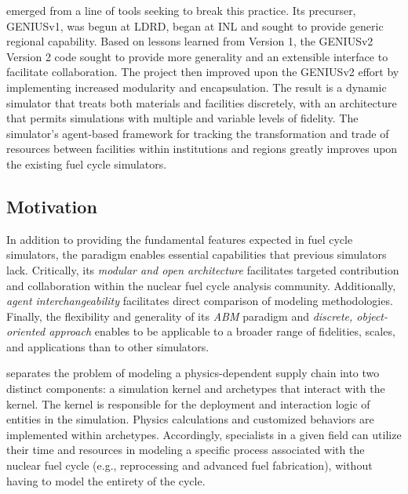 \Cyclus emerged from a line of tools seeking to break this practice.  
Its precurser, \gls{GENIUSv1}\cite{dunzik-gougar_global_2007,jain_transitioning_2006}, was begun at \gls{LDRD}, began at \gls{INL} and sought 
to provide generic regional capability.  Based on lessons learned from 
Version 1, the 
\acrshort{GENIUSv2} Version 2\cite{oliver_studying_2009,huff_geniusv2_2009} code sought to 
provide more generality and an extensible interface to facilitate 
collaboration.  The \Cyclus project then improved upon the \acrshort{GENIUSv2} 
effort by implementing increased modularity and encapsulation.  The result is  
a dynamic simulator that treats both materials and facilities discretely, with 
an architecture that permits simulations with multiple and variable levels of 
fidelity. The simulator's agent-based framework for tracking the 
transformation and trade of resources between facilities within institutions 
and regions greatly improves upon the existing fuel cycle simulators.

\subsection{Motivation}

In addition to providing the fundamental features expected in fuel cycle 
simulators, the \Cyclus paradigm enables essential capabilities that previous 
simulators lack. Critically, its \emph{modular and open architecture}  facilitates 
targeted contribution and collaboration within the nuclear fuel cycle analysis 
community.  Additionally, \emph{agent interchangeability} facilitates direct 
comparison of modeling methodologies. Finally, the flexibility and generality 
of its \emph{\gls{ABM}} paradigm and \emph{discrete, object-oriented approach} 
enables \Cyclus to be applicable to a broader range of 
fidelities, scales, and applications than to other simulators. 

\Cyclus separates the problem of modeling a
physics-dependent supply chain into two distinct components: a simulation kernel and archetypes that
interact with the kernel. The kernel is responsible for the
deployment and interaction logic of entities in the simulation.  Physics calculations and 
customized behaviors are implemented within archetypes. Accordingly, specialists
in a given field can utilize their time and resources in modeling a specific
process associated with the nuclear fuel cycle (e.g., reprocessing and advanced
fuel fabrication), without having to model the entirety of the cycle.


